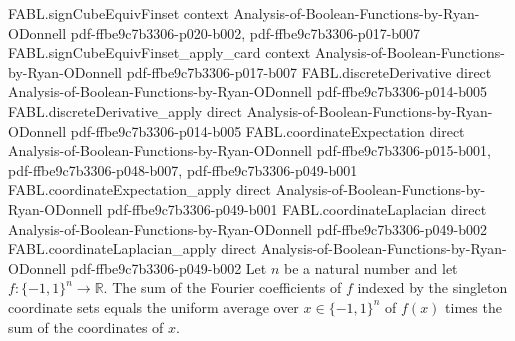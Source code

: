 \begin{theorem}
\proofstep
  {FABL.signCubeEquivFinset}
  {context}
  {Analysis-of-Boolean-Functions-by-Ryan-ODonnell}
  {pdf-ffbe9c7b3306-p020-b002,
    pdf-ffbe9c7b3306-p017-b007}
\proofstep
  {FABL.signCubeEquivFinset_apply_card}
  {context}
  {Analysis-of-Boolean-Functions-by-Ryan-ODonnell}
  {pdf-ffbe9c7b3306-p017-b007}
\proofstep
  {FABL.discreteDerivative}
  {direct}
  {Analysis-of-Boolean-Functions-by-Ryan-ODonnell}
  {pdf-ffbe9c7b3306-p014-b005}
\proofstep
  {FABL.discreteDerivative_apply}
  {direct}
  {Analysis-of-Boolean-Functions-by-Ryan-ODonnell}
  {pdf-ffbe9c7b3306-p014-b005}
\proofstep
  {FABL.coordinateExpectation}
  {direct}
  {Analysis-of-Boolean-Functions-by-Ryan-ODonnell}
  {pdf-ffbe9c7b3306-p015-b001,
    pdf-ffbe9c7b3306-p048-b007,
    pdf-ffbe9c7b3306-p049-b001}
\proofstep
  {FABL.coordinateExpectation_apply}
  {direct}
  {Analysis-of-Boolean-Functions-by-Ryan-ODonnell}
  {pdf-ffbe9c7b3306-p049-b001}
\proofstep
  {FABL.coordinateLaplacian}
  {direct}
  {Analysis-of-Boolean-Functions-by-Ryan-ODonnell}
  {pdf-ffbe9c7b3306-p049-b002}
\proofstep
  {FABL.coordinateLaplacian_apply}
  {direct}
  {Analysis-of-Boolean-Functions-by-Ryan-ODonnell}
  {pdf-ffbe9c7b3306-p049-b002}
Let $n$ be a natural number and let $f:\{-1,1\}^n\to\mathbb R$. The sum of the Fourier
coefficients of $f$ indexed by the singleton coordinate sets equals the uniform average
over $x\in\{-1,1\}^n$ of $f(x)$ times the sum of the coordinates of $x$.
\end{theorem}

